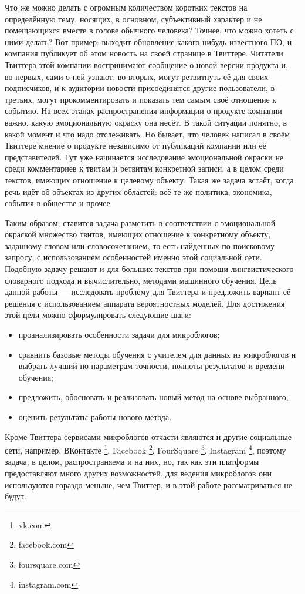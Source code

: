 Что же можно делать с огромным количеством коротких текстов на определённую
тему, носящих, в основном, субъективный характер и не помещающихся вместе
в голове обычного человека? Точнее, что можно хотеть с ними делать? Вот пример:
выходит обновление какого-нибудь известного ПО, и компания публикует об этом
новость на своей странице в Твиттере. Читатели Твиттера этой компании воспринимают
сообщение о новой версии продукта и, во-первых, сами о ней узнают, во-вторых,
могут ретвитнуть её для своих подписчиков, и к аудитории новости присоединятся другие пользователи,
в-третьих, могут прокомментировать и показать тем самым своё отношение к событию.
На всех этапах распространения информации о продукте компании важно, какую
эмоциональную окраску она несёт. В такой ситуации понятно, в какой момент и что
надо отслеживать. Но бывает, что человек написал в своём Твиттере мнение о
продукте независимо от публикаций компании или её представителей. Тут уже
начинается исследование эмоциональной окраски не среди комментариев к твитам и
ретвитам конкретной записи, а в целом среди текстов, имеющих отношение к целевому
объекту. Такая же задача встаёт, когда речь идёт об объектах из других областей:
всё те же политика, экономика, события в обществе и прочее.

Таким образом, ставится задача разметить в соответствии с эмоциональной окраской
множество твитов, имеющих отношение к конкретному объекту, заданному словом или
словосочетанием, то есть найденных по поисковому запросу, с использованием особенностей именно этой социальной сети. Подобную
задачу решают и для больших текстов при помощи лингвистического словарного подхода и
вычислительно, методами машинного обучения. Цель данной работы ---
исследовать проблему для Твиттера и предложить вариант её решения с использованием
аппарата вероятностных моделей. Для достижения этой цели можно сформулировать следующие шаги:
\begin{itemize}
\item проанализировать особенности задачи для микроблогов;
\item сравнить базовые методы обучения с учителем для данных из микроблогов и выбрать лучший по
  параметрам точности, полноты результатов и времени обучения;
\item предложить, обосновать и реализовать новый метод на основе выбранного;
\item оценить результаты работы нового метода.
\end{itemize}

Кроме Твиттера сервисами микроблогов отчасти являются и другие социальные сети, например,
ВКонтакте \footnote{vk.com}, Facebook \footnote{facebook.com}, FourSquare \footnote{foursquare.com},
Instagram \footnote{instagram.com}, поэтому задача, в целом, распространяема и на них,
но, так как эти платформы предоставляют много других возможностей, для ведения
микроблогов они используются гораздо меньше, чем Твиттер, и в этой работе
рассматриваться не будут.

